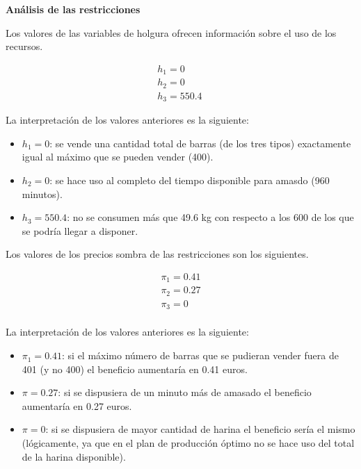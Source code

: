 \textbf{Análisis de las restricciones}

Los valores de las variables de holgura ofrecen información sobre el uso de los recursos.

\begin{equation}
\begin{split}
    h_1 = 0\\
    h_2 = 0\\
    h_3 = 550.4\
\end{split}    
\end{equation}

La interpretación de los valores anteriores es la siguiente:
\begin{itemize}
    \item $h_1 = 0$: se vende una cantidad total de barras (de los tres tipos) exactamente igual al máximo que se pueden vender (400).
    \item $h_2 = 0$: se hace uso al completo del tiempo disponible para amasdo (960 minutos).
    \item $h_3 = 550.4$: no se consumen más que 49.6 kg con respecto a los 600 de los que se podría llegar a disponer.
\end{itemize}

Los valores de los precios sombra de las restricciones son los siguientes.

\begin{equation}
\begin{split}
    \pi_1 = 0.41\\
    \pi_2 = 0.27\\
    \pi_3 = 0\\
\end{split}    
\end{equation}

La interpretación de los valores anteriores es la siguiente:
\begin{itemize}
    \item $\pi_1 = 0.41$: si el máximo número de barras que se pudieran vender fuera de 401 (y no 400) el beneficio aumentaría en 0.41 euros.
    \item $\pi = 0.27$: si se dispusiera de un minuto más de amasado el beneficio aumentaría en 0.27 euros.
    \item $\pi = 0$: si se dispusiera de mayor cantidad de harina el beneficio sería el mismo (lógicamente, ya que en el plan de producción óptimo no se hace uso del total de la harina disponible).
\end{itemize}


